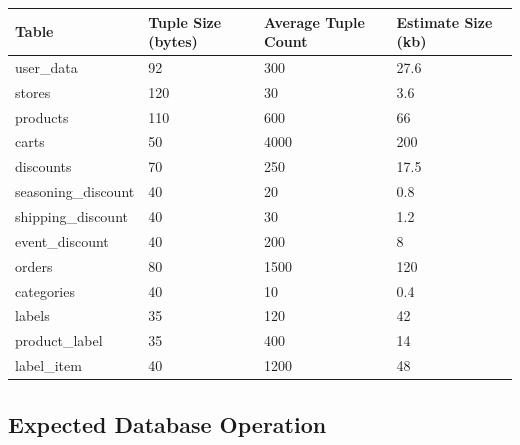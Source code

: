 \documentclass[a4paper, 12pt]{article}
\begin{document}
\noindent\begin{tabular}{ | p{8em} | p{6.5em} | p{6.5em} | p{8em} |}
  \hline 
  Table & Tuple Size (bytes) & Average Tuple Count & Estimate Size (kb) \\
  \hline
  user_data & 92 & 300 & 27.6 \\
  \hline
  stores & 120 & 30 & 3.6 \\
  \hline
  products & 110 & 600 & 66 \\
  \hline
  carts & 50 & 4000 & 200 \\
  \hline
  discounts & 70 & 250 & 17.5 \\
  \hline
  seasoning_discount & 40 & 20 & 0.8 \\
  \hline
  shipping_discount & 40 & 30 & 1.2 \\
  \hline
  event_discount & 40 & 200 & 8 \\
  \hline
  orders & 80 & 1500 & 120 \\
  \hline
  categories & 40 & 10 & 0.4 \\
  \hline
  labels & 35 & 120 & 42 \\
  \hline
  product_label & 35 & 400 & 14 \\
  \hline
  label_item & 40 & 1200 & 48 \\
  \hline
\end{tabular}

\subsection{Expected Database Operation}
\end{document}
